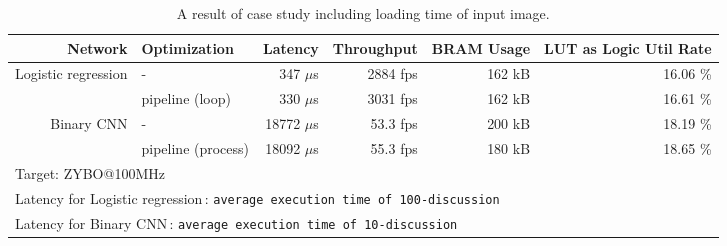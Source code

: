 \begin{table}[tbp]
  \caption{A result of case study including loading time of input image.}
  \label{tab:result}
  \begin{adjustwidth}{-2in}{-2in}
    \centering
    \begin{tabular}{rl|rrrr}
      \hline\hline
      Network              & Optimization     &      Latency & Throughput & BRAM Usage & LUT as Logic Util Rate\\
      \hline
      \multirow{2}{*}{
      Logistic regression} & -                &   347 $\mu$s & 2884 fps & 162 kB & 16.06 \% \\
                           & pipeline (loop) &   330 $\mu$s & 3031 fps & 162 kB & 16.61 \% \\
      \multirow{2}{*}{
      Binary CNN}          & -                & 18772 $\mu$s & 53.3 fps & 200 kB & 18.19 \% \\
                           & pipeline (process) & 18092 $\mu$s & 55.3 fps & 180 kB & 18.65 \% \\
      \hline
      \multicolumn{6}{l}{Target: ZYBO@100MHz}\\
      \multicolumn{6}{l}{Latency for Logistic regression\,: {\tt average execution time of 100-discussion}}\\
      \multicolumn{6}{l}{Latency for Binary CNN\,: {\tt average execution time of 10-discussion}}\\
    \end{tabular}
  \end{adjustwidth}
\end{table}

